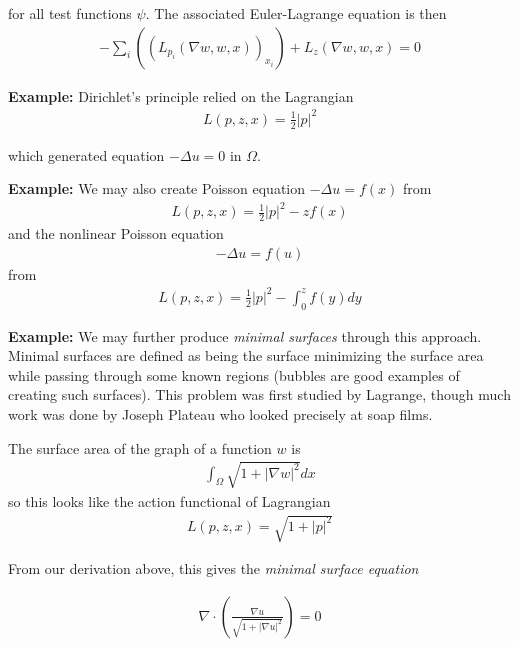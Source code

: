 \documentclass{article}
\begin{document}
	for all test functions $\psi$. The associated Euler-Lagrange equation is then 
	\begin{align*}
		-\sum_{i} ((L_{p_i}(\nabla w, w, x))_{x_i}) + L_{z}(\nabla w, w,x) = 0
	\end{align*}
	
	
	\vspace{1cm}
	\textbf{Example:} Dirichlet's principle relied on the Lagrangian
	\begin{align*}
		L(p,z,x) = \frac{1}{2} |p|^{2}
	\end{align*}
	
	which generated equation $-\Delta u = 0$ in $\Omega$. 
	
	\vspace{1cm}
	
	\textbf{Example:} We may also create Poisson equation $-\Delta u = f(x)$ from 
	\begin{align*}
		L(p,z,x) = \frac{1}{2}|p|^{2} - zf(x)
	\end{align*}
	and the nonlinear Poisson equation 
	\begin{align*}
		-\Delta u = f(u)
	\end{align*}
	from 
	\begin{align*}
		L(p,z,x) = \frac{1}{2}|p|^{2} - \int_{0}^{z} f(y)dy
	\end{align*}
	
	
	\vspace{1cm}
	
	\textbf{Example:} We may further produce \textit{minimal surfaces} through this approach. Minimal surfaces are defined as being the surface minimizing the surface area while passing through some known regions (bubbles are good examples of creating such surfaces). This problem was first studied by Lagrange, though much work was done by Joseph Plateau who looked precisely at soap films. 
	
	The surface area of the graph of a function $w$ is 
	\begin{align*}
		\int_{\Omega} \sqrt{1+|\nabla w|^{2}}dx
	\end{align*}
	so this looks like the action functional of Lagrangian 
	\begin{align*}
		L(p,z,x) = \sqrt{1+|p|^{2}}
	\end{align*}
	
	From our derivation above, this gives the \textit{minimal surface equation}
	
	\begin{align*}
		\nabla \cdot \left(\frac{ \nabla u }{\sqrt{1+ |\nabla u |^{2}}}\right) = 0
	\end{align*}
	
\end{document}
